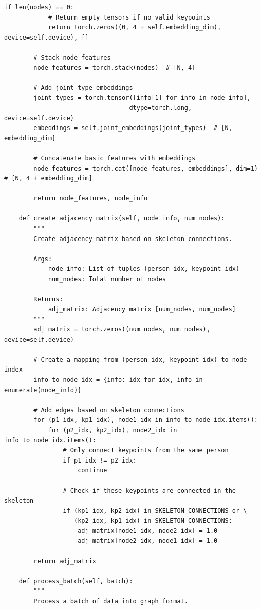 \begin{lstlisting}[style=pythonstyle,title={Preprocessing May},label={code:preprocessing_may}]
        if len(nodes) == 0:
            # Return empty tensors if no valid keypoints
            return torch.zeros((0, 4 + self.embedding_dim), device=self.device), []
        
        # Stack node features
        node_features = torch.stack(nodes)  # [N, 4]
        
        # Add joint-type embeddings
        joint_types = torch.tensor([info[1] for info in node_info], 
                                  dtype=torch.long, device=self.device)
        embeddings = self.joint_embeddings(joint_types)  # [N, embedding_dim]
        
        # Concatenate basic features with embeddings
        node_features = torch.cat([node_features, embeddings], dim=1)  # [N, 4 + embedding_dim]
        
        return node_features, node_info
    
    def create_adjacency_matrix(self, node_info, num_nodes):
        """
        Create adjacency matrix based on skeleton connections.
        
        Args:
            node_info: List of tuples (person_idx, keypoint_idx)
            num_nodes: Total number of nodes
            
        Returns:
            adj_matrix: Adjacency matrix [num_nodes, num_nodes]
        """
        adj_matrix = torch.zeros((num_nodes, num_nodes), device=self.device)
        
        # Create a mapping from (person_idx, keypoint_idx) to node index
        info_to_node_idx = {info: idx for idx, info in enumerate(node_info)}
        
        # Add edges based on skeleton connections
        for (p1_idx, kp1_idx), node1_idx in info_to_node_idx.items():
            for (p2_idx, kp2_idx), node2_idx in info_to_node_idx.items():
                # Only connect keypoints from the same person
                if p1_idx != p2_idx:
                    continue
                
                # Check if these keypoints are connected in the skeleton
                if (kp1_idx, kp2_idx) in SKELETON_CONNECTIONS or \
                   (kp2_idx, kp1_idx) in SKELETON_CONNECTIONS:
                    adj_matrix[node1_idx, node2_idx] = 1.0
                    adj_matrix[node2_idx, node1_idx] = 1.0
        
        return adj_matrix
    
    def process_batch(self, batch):
        """
        Process a batch of data into graph format.
        

\end{lstlisting}
